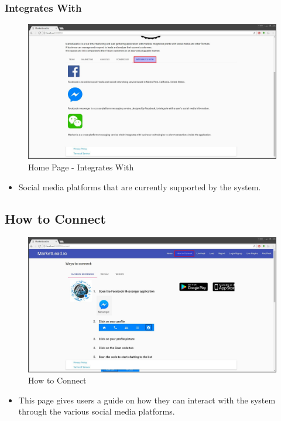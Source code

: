 \documentclass{article}
\begin{document}
			\subsubsection{Integrates With}
				\begin{figure}[H]
					\includegraphics[width=\textwidth]{images/home_integrates_with.jpg}
					\caption{Home Page - Integrates With}
				\end{figure}

				\begin{itemize}
					\item Social media platforms that are currently supported by the system.
				\end{itemize}

		\subsection{How to Connect}
			\begin{figure}[H]
				\includegraphics[width=\textwidth]{images/how_to_connect.jpg}
				\caption{How to Connect}
			\end{figure}

			\begin{itemize}
				\item This page gives users a guide on how they can interact with the system through the various social media platforms.
			\end{itemize}
\end{document}
